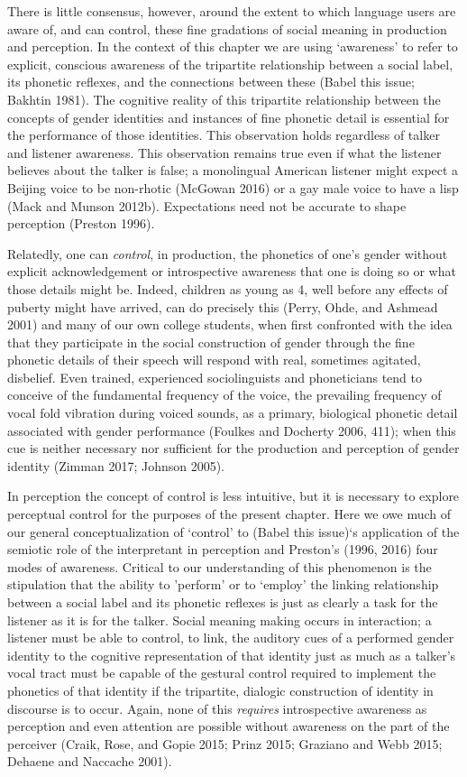 \documentclass[
  letterpaper,
  DIV=11,
  numbers=noendperiod]{scrartcl}
\begin{document}
There is little consensus, however, around the extent to which language
users are aware of, and can control, these fine gradations of social
meaning in production and perception. In the context of this chapter we
are using `awareness' to refer to explicit, conscious awareness of the
tripartite relationship between a social label, its phonetic reflexes,
and the connections between these (Babel this issue; Bakhtin 1981). The
cognitive reality of this tripartite relationship between the concepts
of gender identities and instances of fine phonetic detail is essential
for the performance of those identities. This observation holds
regardless of talker and listener awareness. This observation remains
true even if what the listener believes about the talker is false; a
monolingual American listener might expect a Beijing voice to be
non-rhotic (McGowan 2016) or a gay male voice to have a lisp (Mack and
Munson 2012b). Expectations need not be accurate to shape perception
(Preston 1996).

Relatedly, one can \emph{control}, in production, the phonetics of one's
gender without explicit acknowledgement or introspective awareness that
one is doing so or what those details might be. Indeed, children as
young as 4, well before any effects of puberty might have arrived, can
do precisely this (Perry, Ohde, and Ashmead 2001) and many of our own
college students, when first confronted with the idea that they
participate in the social construction of gender through the fine
phonetic details of their speech will respond with real, sometimes
agitated, disbelief. Even trained, experienced sociolinguists and
phoneticians tend to conceive of the fundamental frequency of the voice,
the prevailing frequency of vocal fold vibration during voiced sounds,
as a primary, biological phonetic detail associated with gender
performance (Foulkes and Docherty 2006, 411); when this cue is neither
necessary nor sufficient for the production and perception of gender
identity (Zimman 2017; Johnson 2005).

In perception the concept of control is less intuitive, but it is
necessary to explore perceptual control for the purposes of the present
chapter. Here we owe much of our general conceptualization of `control'
to (Babel this issue)`s application of the semiotic role of the
interpretant in perception and Preston's (1996, 2016) four modes of
awareness. Critical to our understanding of this phenomenon is the
stipulation that the ability to 'perform' or to `employ' the linking
relationship between a social label and its phonetic reflexes is just as
clearly a task for the listener as it is for the talker. Social meaning
making occurs in interaction; a listener must be able to control, to
link, the auditory cues of a performed gender identity to the cognitive
representation of that identity just as much as a talker's vocal tract
must be capable of the gestural control required to implement the
phonetics of that identity if the tripartite, dialogic construction of
identity in discourse is to occur. Again, none of this \emph{requires}
introspective awareness as perception and even attention are possible
without awareness on the part of the perceiver (Craik, Rose, and Gopie
2015; Prinz 2015; Graziano and Webb 2015; Dehaene and Naccache 2001).
\end{document}
